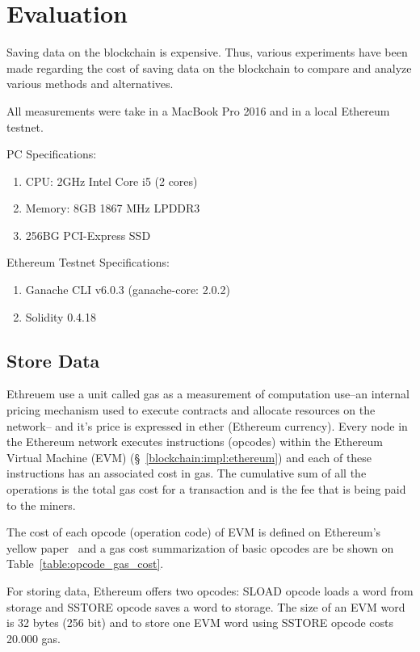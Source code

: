 \chapter{Evaluation}
\label{evaluation}

Saving data on the blockchain is expensive. Thus, various experiments have been made regarding the cost of saving data on the blockchain to compare and analyze various methods and alternatives.

All measurements were take in a MacBook Pro 2016 and in a local Ethereum testnet.

PC Specifications:

\begin{enumerate}
  \item CPU: 2GHz Intel Core i5 (2 cores)
  \item Memory: 8GB 1867 MHz LPDDR3
  \item 256BG PCI-Express SSD
\end{enumerate}

Ethereum Testnet Specifications:

\begin{enumerate}
  \item Ganache CLI v6.0.3 (ganache-core: 2.0.2)
  \item Solidity 0.4.18
\end{enumerate}

\section{Store Data}
\label{evaluation:store_data}

Ethreuem use a unit called gas as a measurement of computation use--an internal pricing mechanism used to execute contracts and allocate resources on the network-- and it's price is expressed in ether (Ethereum currency). Every node in the Ethereum network executes instructions (opcodes) within the Ethereum Virtual Machine (EVM) (§~\ref{blockchain:impl:ethereum}) and each of these instructions has an associated cost in gas. The cumulative sum of all the operations is the total gas cost for a transaction and is the fee that is being paid to the miners.

The cost of each opcode (operation code) of EVM is defined on Ethereum's yellow paper~\cite{ethereum_yellowpaper} and a gas cost summarization of basic opcodes are be shown on Table~\ref{table:opcode_gas_cost}.

For storing data, Ethereum offers two opcodes: SLOAD opcode loads a word from storage and SSTORE opcode saves a word to storage. The size of an EVM word is 32 bytes (256 bit) and to store one EVM word using SSTORE opcode costs 20.000 gas.

